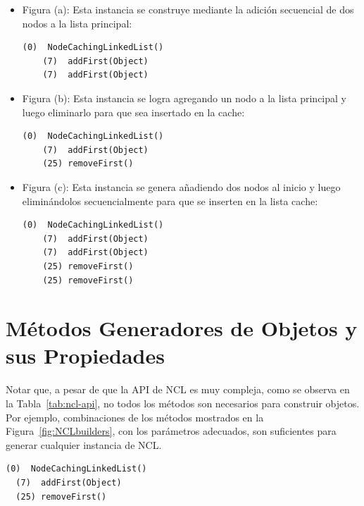 \begin{itemize}
\item Figura (a): Esta instancia se construye mediante la adición secuencial de dos nodos a la lista principal:
\vspace{5pt} 
    \begin{lstlisting}[numbers=none,label=fig:NCLbuilders_a,xleftmargin=0pt]
    (0)  NodeCachingLinkedList()
    (7)  addFirst(Object)
    (7)  addFirst(Object)
    \end{lstlisting}

\item Figura (b):  
    Esta instancia se logra agregando un nodo a la lista principal y luego eliminarlo para que sea insertado en la cache:
    \vspace{5pt} 

    \begin{lstlisting}[numbers=none,label=fig:NCLbuilders_b, xleftmargin=0pt]
    (0)  NodeCachingLinkedList()
    (7)  addFirst(Object)
    (25) removeFirst()
    \end{lstlisting}

\item Figura (c): 
    Esta instancia se genera añadiendo dos nodos al inicio y luego eliminándolos secuencialmente para que se inserten en la lista cache:
    \vspace{5pt} 

    \begin{lstlisting}[numbers=none,label=fig:NCLbuilders_c, xleftmargin=0pt]
    (0)  NodeCachingLinkedList()
    (7)  addFirst(Object)
    (7)  addFirst(Object)  
    (25) removeFirst()
    (25) removeFirst()
    \end{lstlisting}

\end{itemize}



\section{Métodos Generadores de Objetos y sus Propiedades}

Notar que, a pesar de que la API de NCL es muy compleja, como se observa en la Tabla~\ref{tab:ncl-api}, no todos los métodos son necesarios para construir objetos. Por ejemplo, combinaciones de los métodos mostrados en la Figura~\ref{fig:NCLbuilders}, con los parámetros adecuados, son suficientes para generar cualquier instancia de NCL.
\vspace{5pt} 
\begin{lstlisting}[numbers=none,label=fig:NCLbuilders, caption=Conjunto de métodos generadores de objetos para NCL]
  (0)  NodeCachingLinkedList()
  (7)  addFirst(Object)
  (25) removeFirst()
\end{lstlisting}


